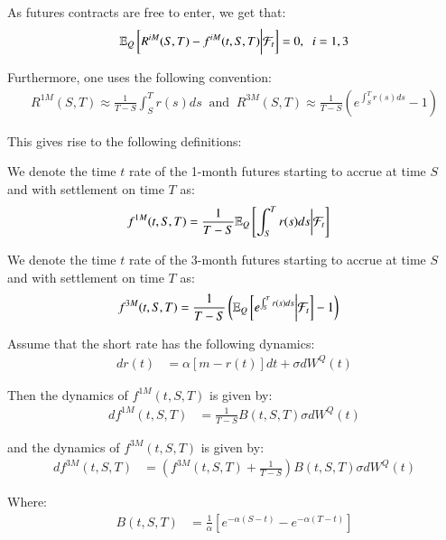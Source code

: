As futures contracts are free to enter, we get that: 
\begin{align*}
\mathbb{E}_{Q}\left[
R^{iM}(S,T) - f^{iM}(t,S,T)\bigg{|}\mathcal{F}_{t}
\right] = 0, \;\; i = 1,3   
\end{align*}

Furthermore, one uses the following convention: 
\begin{align*}
R^{1M}(S,T) \approx  \frac{1}{T-S}\int_{S}^{T}r(s)ds 
\;\;\text{and}\;\;
R^{3M}(S,T) \approx  \frac{1}{T-S}\left(e^{\int_{S}^{T}r(s)ds} -1\right) 
\end{align*}

This gives rise to the following definitions:

\begin{definition}
\label{def: 1M_SOFR_futures}
We denote the time $t$ rate of the 1-month futures starting to accrue at time $S$ and with settlement on time $T$ as:
\begin{align*}
f^{1M}(t,S,T) &= \frac{1}{T-S}\mathbb{E}_{Q}\left[
\int_{S}^{T}r(s)ds\bigg{|}\mathcal{F}_{t}
\right]    
\end{align*}
\end{definition} 

\begin{definition}
\label{def: 3M_SOFR_futures}
We denote the time $t$ rate of the 3-month futures starting to accrue at time $S$ and with settlement on time $T$ as:  
\begin{align*}
f^{3M}(t,S,T) &= \frac{1}{T-S}\left(
\mathbb{E}_{Q}\left[e^{\int_{S}^{T}r(s)ds}\bigg{|}\mathcal{F}_{t}\right] - 1
\right)    
\end{align*}
\end{definition} 

\newpage 

\begin{proposition}
Assume that the short rate has the following dynamics: 
\begin{align*}
dr(t) &= \alpha[m-r(t)]dt + \sigma dW^{Q}(t)    
\end{align*}

Then the dynamics of $f^{1M}(t,S,T)$ is given by:
\begin{align*}
df^{1M}(t,S,T) &= \frac{1}{T-S}B(t,S,T)\sigma dW^{Q}(t)
\end{align*}

and the dynamics of $f^{3M}(t,S,T)$ is given by: 
\begin{align*}
df^{3M}(t,S,T) &= \left(
f^{3M}(t,S,T) +\frac{1}{T-S}
\right)B(t,S,T)\sigma dW^{Q}(t)
\end{align*}

Where: 
\begin{align*}
B(t,S,T) &= \frac{1}{\alpha}\left[
e^{-\alpha(S-t)}-e^{-\alpha(T-t)}
\right]    
\end{align*}
\end{proposition}


